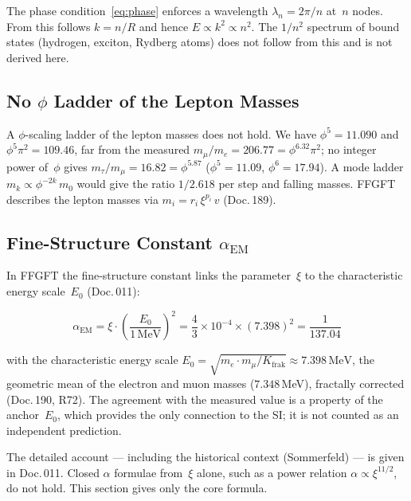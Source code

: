 The phase condition~\eqref{eq:phase} enforces a wavelength
$\lambda_n = 2\pi/n$ at~$n$ nodes. From this follows $k = n/R$ and hence
$E \propto k^2 \propto n^2$. The $1/n^2$ spectrum of bound states
(hydrogen, exciton, Rydberg atoms) does not follow from this and is not
derived here.

\subsection{No $\phi$ Ladder of the Lepton Masses}

A $\phi$-scaling ladder of the lepton masses does not hold. We have
$\phi^5 = 11.090$ and $\phi^5\pi^2 = 109.46$, far from the measured
$m_\mu/m_e = 206.77 = \phi^{6.32}\pi^2$; no integer power of~$\phi$ gives
$m_\tau/m_\mu = 16.82 = \phi^{5.87}$ ($\phi^5 = 11.09$, $\phi^6 = 17.94$).
A mode ladder $m_k \propto \phi^{-2k}\,m_0$ would give the ratio $1/2.618$
per step and falling masses. FFGFT describes the lepton masses via
$m_i = r_i\,\xi^{p_i}\,v$ (Doc.\,189).

\subsection{Fine-Structure Constant $\alpha_\text{EM}$}

In FFGFT the fine-structure constant links the parameter~$\xi$ to the
characteristic energy scale~$E_0$ (Doc.\,011):

\begin{equation}
  \alpha_\text{EM} = \xi \cdot \left(\frac{E_0}{1\,\text{MeV}}\right)^2
  = \frac{4}{3} \times 10^{-4} \times (7.398)^2
  = \frac{1}{137.04}
\end{equation}

\noindent with the characteristic energy scale
$E_0 = \sqrt{m_e \cdot m_\mu/K_{\text{frak}}} \approx 7.398\,\text{MeV}$,
the geometric mean of the electron and muon masses ($7.348$\,MeV), fractally corrected (Doc.\,190, R72). The agreement with the measured value is a property of the anchor~$E_0$, which provides the only connection to the SI; it is not counted as an independent prediction.

\begin{warnbox}
The detailed account — including the historical context
(Sommerfeld) — is given in Doc.\,011. Closed $\alpha$ formulae from~$\xi$
alone, such as a power relation $\alpha \propto \xi^{11/2}$, do not hold.
This section gives only the core formula.
\end{warnbox}

